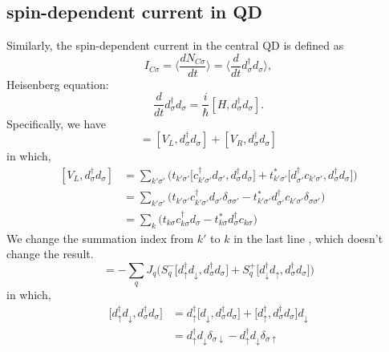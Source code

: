 \documentclass[11pt,a4paper]{book}
\begin{document}
\subsection{spin-dependent current in QD}
Similarly, the spin-dependent current in the central QD is defined as
\begin{equation}
I_{C\sigma} = \langle\frac{dN_{C\sigma}}{dt} \rangle= \langle  \frac{d}{dt} d_{\sigma}^{\dag}d_{\sigma}\rangle,
\end{equation}
Heisenberg equation:
\begin{equation}
\frac{d}{dt} d_{\sigma}^{\dag}d_{\sigma} = \frac{i}{\hbar} [H, d_{\sigma}^{\dag}d_{\sigma}].
\end{equation}
Specifically, we have
\begin{equation}
 [H, d_{\sigma}^{\dag}d_{\sigma}] = [V_{L},  d_{\sigma}^{\dag}d_{\sigma}] + [V_{R},  d_{\sigma}^{\dag}d_{\sigma}]
\end{equation}
in which,
\begin{equation}
\begin{split}
[V_{L},  d_{\sigma}^{\dag}d_{\sigma}] &= \sum_{k'\sigma'}\big(t_{k'\sigma'} \big[c_{k'\sigma'}^{\dag}d_{\sigma'},  d_{\sigma}^{\dag}d_{\sigma}\big] + t_{k'\sigma'}^{*} \big[d_{\sigma'}^{\dag}c_{k'\sigma'},  d_{\sigma}^{\dag}d_{\sigma}\big] \big) \\
&  = \sum_{k'\sigma'}\big(t_{k'\sigma'} c_{k'\sigma'}^{\dag}d_{\sigma'}\delta_{\sigma\sigma'} - t_{k'\sigma'}^{*} d_{\sigma'}^{\dag}c_{k'\sigma'} \delta_{\sigma\sigma'}\big) \\
&= \sum_{k}\big(t_{k\sigma} c_{k\sigma}^{\dag}d_{\sigma} - t_{k\sigma}^{*} d_{\sigma}^{\dag}c_{k\sigma} \big)
\end{split}
\end{equation}
We change the summation index from $k'$ to $k$ in the last line , which doesn't change the result.
\begin{equation}
[V_{R},  d_{\sigma}^{\dag}d_{\sigma}] = -\sum_{q}J_{q}\big( S_{q}^{-} \big[d_{\uparrow}^{\dag}d_{\downarrow}, d_{\sigma}^{\dag}d_{\sigma} \big] + S_{q}^{+}\big[d_{\downarrow}^{\dag}d_{\uparrow}, d_{\sigma}^{\dag}d_{\sigma} \big]\big)
\end{equation}
in which,
\begin{equation}
\begin{split}
\big[d_{\uparrow}^{\dag}d_{\downarrow}, d_{\sigma}^{\dag}d_{\sigma} \big] &= d_{\uparrow}^{\dag} \big[d_{\downarrow}, d_{\sigma}^{\dag}d_{\sigma}\big] + \big[d_{\uparrow}^{\dag} , d_{\sigma}^{\dag}d_{\sigma} \big]d_{\downarrow} \\
&=d_{\uparrow}^{\dag}d_{\downarrow}\delta_{\sigma \downarrow} - d_{\uparrow}^{\dag}d_{\downarrow}\delta_{\sigma \uparrow}
\end{split}
\end{equation}
\end{document}
